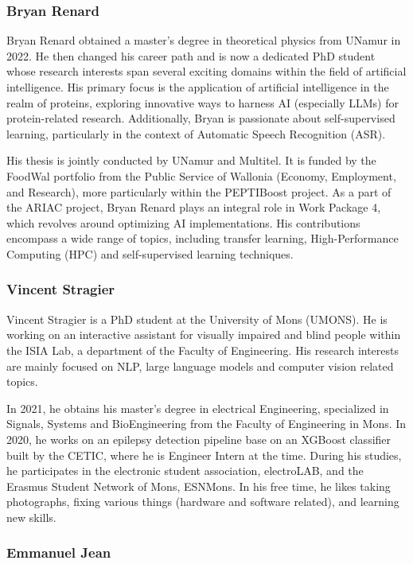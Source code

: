 \subsubsection{Bryan Renard}

Bryan Renard obtained a master's degree in theoretical physics from UNamur in 2022. He then changed his career path and is now a dedicated PhD student whose research interests span several exciting domains within the field of artificial intelligence. His primary focus is the application of artificial intelligence in the realm of proteins, exploring innovative ways to harness AI (especially LLMs) for protein-related research. Additionally, Bryan is passionate about self-supervised learning, particularly in the context of Automatic Speech Recognition (ASR).

His thesis is jointly conducted by UNamur and Multitel. It is funded by the FoodWal portfolio from the Public Service of Wallonia (Economy, Employment, and Research), more particularly within the PEPTIBoost project. As a part of the ARIAC project, Bryan Renard plays an integral role in Work Package 4, which revolves around optimizing AI implementations. His contributions encompass a wide range of topics, including transfer learning, High-Performance Computing (HPC) and self-supervised learning techniques.

\subsubsection{Vincent Stragier}

Vincent Stragier is a PhD student at the University of Mons (UMONS). He is working on an interactive assistant for visually impaired and blind people within the ISIA Lab, a department of the Faculty of Engineering. His research interests are mainly focused on NLP, large language models and computer vision related topics.

In 2021, he obtains his master’s degree in electrical Engineering, specialized in Signals, Systems and BioEngineering from the Faculty of Engineering in Mons. In 2020, he works on an epilepsy detection pipeline base on an XGBoost classifier built by the CETIC, where he is Engineer Intern at the time. During his studies, he participates in the electronic student association, electroLAB, and the Erasmus Student Network of Mons, ESNMons. In his free time, he likes taking photographs, fixing various things (hardware and software related), and learning new skills.

\subsubsection{Emmanuel Jean}

